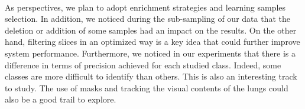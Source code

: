 \paragraph{}
As perspectives, we plan to adopt enrichment strategies and learning samples selection. In addition, we noticed during the sub-sampling of our data that the deletion or addition of some samples had an impact on the results. On the other hand, filtering slices in an optimized way is a key idea that could further improve system performance. Furthermore, we noticed in our experiments that there is a difference in terms of precision achieved for each studied class. Indeed, some classes are more difficult to identify than others. This is also an interesting track to study. The use of masks and tracking the visual contents of the lungs could also be a good trail to explore.